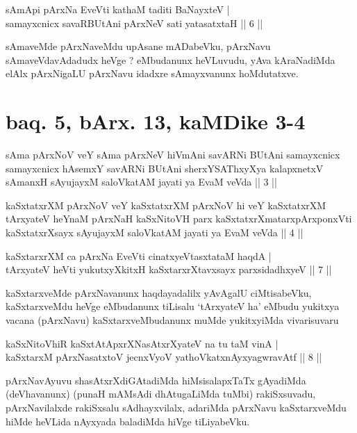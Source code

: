 \begin{shl}
sAmApi pArxNa EveVti kathaM taditi BaNayxteV | \\
samayxcnicx savaRBUtAni pArxNeV sati yatasatxtaH \hfill ||  6 || 
\end{shl}

\begin{artha}
sAmaveMde pArxNaveMdu upAsane mADabeVku, pArxNavu sAmaveVdavAdadudx heVge ? eMbudanunx heVLuvudu, yAva kAraNadiMda elAlx pArxNigaLU pArxNavu idadxre sAmayxvanunx hoMdutatxve.
\end{artha}

\section*{baq. 5, bArx. 13, kaMDike 3-4}

\begin{shl}
sAma pArxNoV veY sAma pArxNeV hiVmAni savARNi BUtAni samayxcnicx samayxcnicx hAsemxY savARNi BUtAni sherxYSAThxyXya kalapxnetxV sAmanxH sAyujayxM saloVkatAM jayati ya EvaM veVda || 3 ||
\end{shl}

\begin{shl}
kaSxtatxrXM pArxNoV veY kaSxtatxrXM pArxNoV hi veY kaSxtatxrXM tArxyateV heYnaM pArxNaH kaSxNitoVH parx kaSxtatxrXmatarxpArxponxVti kaSxtatxrXsayx sAyujayxM saloVkatAM jayati ya EvaM veVda || 4 ||
\end{shl}


\begin{shl}
kaSxtarxrXM ca pArxNa EveVti cinatxyeVtasxtataM haqdA | \\
tArxyateV heVti yukutxyXkitxH kaSxtarxrXtavxsayx parxsidadhxyeV \hfill ||  7 || 
\end{shl}

\begin{artha}
kaSxtarxveMde pArxNavanunx haqdayadalilx yAvAgalU ciMtisabeVku, kaSxtarxveMdu heVge eMbudanunx tiLisalu `tArxyateV ha' eMbudu yukitxya vacana (pArxNavu) kaSxtarxveMbudanunx muMde yukitxyiMda vivarisuvaru \mdash 
\end{artha}

\begin{shl}
kaSxNitoVhiR kaSxtAtApxrXNasAtxrXyateV na tu taM vinA | \\
kaSxtarxM pArxNasatxtoV jecnxVyoV yathoVkatxnAyxyagwravAtf \hfill ||  8 || 
\end{shl}

\begin{artha}
pArxNavAyuvu shasAtxrXdiGAtadiMda hiMsisalapxTaTx gAyadiMda (deVhavanunx) (punaH mAMsAdi dhAtugaLiMda tuMbi) rakiSxsuvadu, pArxNavilalxde rakiSxsalu sAdhayxvilalx, adariMda pArxNavu kaSxtarxveMdu hiMde heVLida nAyxyada baladiMda hiVge tiLiyabeVku.
\end{artha}

